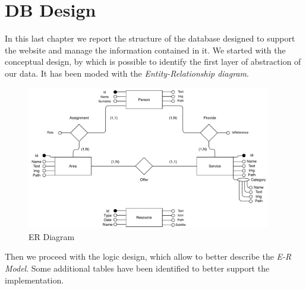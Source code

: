 \documentclass[12pt]{report}
\begin{document}
\chapter{DB Design}
In this last chapter we report the structure of the database designed 
to support the website and manage the information contained in it. 
We started with the conceptual design, by which is possible to identify
the first layer of abstraction of our data. It has been moded with the 
\emph{Entity-Relationship diagram}.\\
\begin{figure}[H]
	\centering
	\includegraphics[width=0.95\textwidth]{ER_model.pdf}
	\caption{ER Diagram}
\end{figure}
\noindent
Then we proceed with the logic design, which allow to better describe the
\emph{E-R Model}. Some additional tables have been identified to better 
support the implementation.
\clearpage
\end{document}
